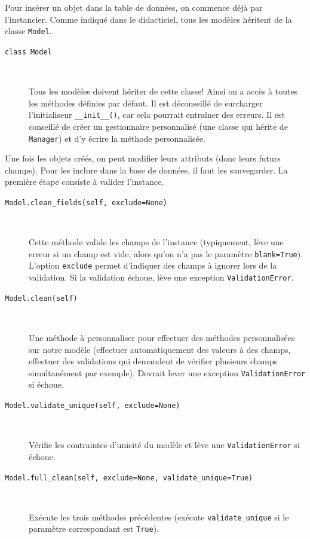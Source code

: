 \documentclass[a4paper, 10pt]{article}
\begin{document}
Pour insérer un objet dans la table de données, on commence déjà par l'instancier. Comme indiqué dans le didacticiel, tous les modèles héritent de la classe \texttt{Model}.

\begin{description}
    \item[\texttt{class Model}]~

          Tous les modèles doivent hériter de cette classe! Ainsi on a accès à toutes les méthodes définies par défaut. Il est déconseillé de surcharger l'initialiseur \texttt{__init__()}, car cela pourrait entraîner des erreurs. Il est conseillé de créer un gestionnaire personnalisé (une classe qui hérite de \texttt{Manager}) et d'y écrire la méthode personnalisée.
\end{description}

Une fois les objets créés, on peut modifier leurs attributs (donc leurs futurs champs). Pour les inclure dans la base de données, il faut les sauvegarder. La première étape consiste à valider l'instance.

\begin{description}
    \item[\texttt{Model.clean_fields(self, exclude=None)}]~

          Cette méthode valide les champs de l'instance (typiquement, lève une erreur si un champ est vide, alors qu'on n'a pas le paramètre \texttt{blank=True}). L'option \texttt{exclude} permet d'indiquer des champs à ignorer lors de la validation. Si la validation échoue, lève une exception \texttt{ValidationError}.

    \item[\texttt{Model.clean(self)}]~

          Une méthode à personnaliser pour effectuer des méthodes personnalisées sur notre modèle (effectuer automatiquement des valeurs à des champs, effectuer des validations qui demandent de vérifier plusieurs champs simultanément par exemple). Devrait lever une exception \texttt{ValidationError} si échoue.

    \item[\texttt{Model.validate_unique(self, exclude=None)}]~

          Vérifie les contraintes d'unicité du modèle et lève une \texttt{ValidationError} si échoue.

    \item[\texttt{Model.full_clean(self, exclude=None, validate_unique=True)}]~

          Exécute les trois méthodes précédentes (exécute \texttt{validate\_unique} si le paramètre correspondant est \texttt{True}).
\end{description}
\end{document}
